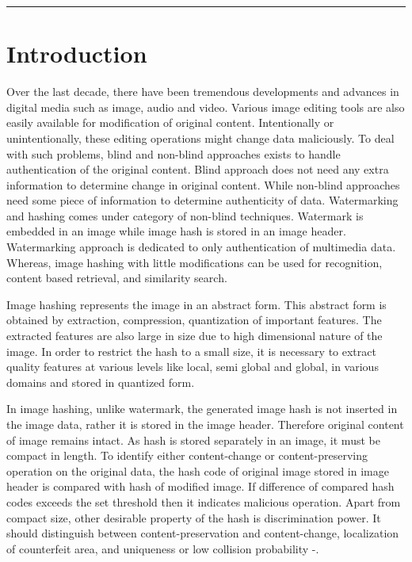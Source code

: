 \documentclass[12pt,a4paper]{jihmsp}
\begin{document}
{{\begin{abstract}
		{\bf Keywords:} Authentication, CSLBP, Hashing, Histogram, Quantization, Standard Deviation, Laplacian of Gaussian
		
	\end{abstract}
	
	\rule{15cm}{1pt}
	
	\section{Introduction}
	
Over the last decade, there have been tremendous developments and advances in digital media such as image, audio and video. Various image editing tools are also easily available for modification of original content. Intentionally or unintentionally, these editing operations might change data maliciously. To deal with such problems, blind and non-blind approaches exists to handle authentication of the original content. Blind approach does not need any extra information to determine change in original content. While non-blind approaches need some piece of information to determine authenticity of data. Watermarking and hashing comes under category of non-blind techniques. Watermark is embedded in an image while image hash is stored in an image header. Watermarking approach is dedicated to only authentication of multimedia data. Whereas, image hashing with little modifications can be used for recognition, content based retrieval, and similarity search.
\par
Image hashing represents the image in an abstract form. This abstract form is obtained by extraction, compression, quantization of important features. The extracted features are also large in size due to high dimensional nature of the image. In order to restrict the hash to a small size, it is necessary to extract quality features at various levels like local, semi global and global, in various domains and stored in quantized form. 
\par
In image hashing, unlike watermark, the generated image hash is not inserted in the image data, rather it is stored in the image header. Therefore original content of image remains intact. As hash is stored separately in an image, it must be compact in length. To identify either content-change or content-preserving operation on the original data, the hash code of original image stored in image header is compared with hash of modified image. If difference of compared hash codes exceeds the set threshold then it indicates malicious operation. Apart from compact size, other desirable property of the hash is discrimination power. It should distinguish between content-preservation and content-change, localization of counterfeit area, and uniqueness or low collision probability \cite{mall2012}-\cite{mallroy2013}.

}}
\end{document}
